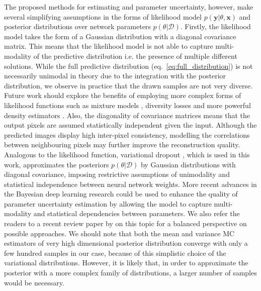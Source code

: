  The proposed methods for estimating  and parameter uncertainty, however, make several simplifying assumptions in the forms of likelihood model $p(\mathbf{y}|\theta, \mathbf{x})$ and posterior distributions over network parameters $p(\theta|\mathcal{D})$. Firstly, the likelihood model takes the form of a Gaussian distribution with a diagonal covariance matrix. This means that the likelihood model is not able to capture multi-modality of the predictive distribution i.e. the presence of multiple different solutions. While the full predictive distribution (eq.~\eqref{eq:full_distribution}) is not necessarily unimodal in theory due to the integration with the posterior distribution, we observe in practice that the drawn samples are not very diverse. Future work should explore the benefits of employing more complex forms of likelihood functions such as mixture models \cite{bishop1994mixture,kohl2018probabilistic}, diversity losses \cite{guzman2012multiple,bouchacourt2016disco,lee2018diverse} and more powerful density estimators \cite{huang2018multimodal,rezende2015variational,papamakarios2017masked,odena2017conditional,kohl2018probabilistic}. Also, the diagonality of covariance matrices means that the output pixels are assumed statistically independent given the input. Although the predicted images display high inter-pixel consistency, modelling the correlations between neighbouring pixels \cite{chandra2016fast} may further improve the reconstruction quality. Analogous to the likelihood function, variational dropout \cite{kingma2015variational}, which is used in this work, approximates the posteriors $p(\theta|\mathcal{D})$ by Gaussian distributions with diagonal covariance, imposing restrictive assumptions of unimodality and statistical independence between neural network weights. More recent advances in the Bayesian deep learning research \cite{louizos2016structured,oh2019radial,krueger2017bayesian,zhang2019cyclical,pawlowski2017implicit,louizos2017multiplicative} could be used to enhance the quality of parameter uncertainty estimation by allowing the model to capture multi-modality and statistical dependencies between parameters.  We also refer the readers to a recent review paper by \cite{zhang2018advances} on this topic for a balanced perspective on possible approaches. We should note that both the mean and variance MC estimators of very high dimensional posterior distribution converge with only a few hundred samples in our case, because of this simplistic choice of the variational distributions. However, it is likely that, in order to approximate the posterior with a more complex family of distributions, a larger number of samples would be necessary. 

